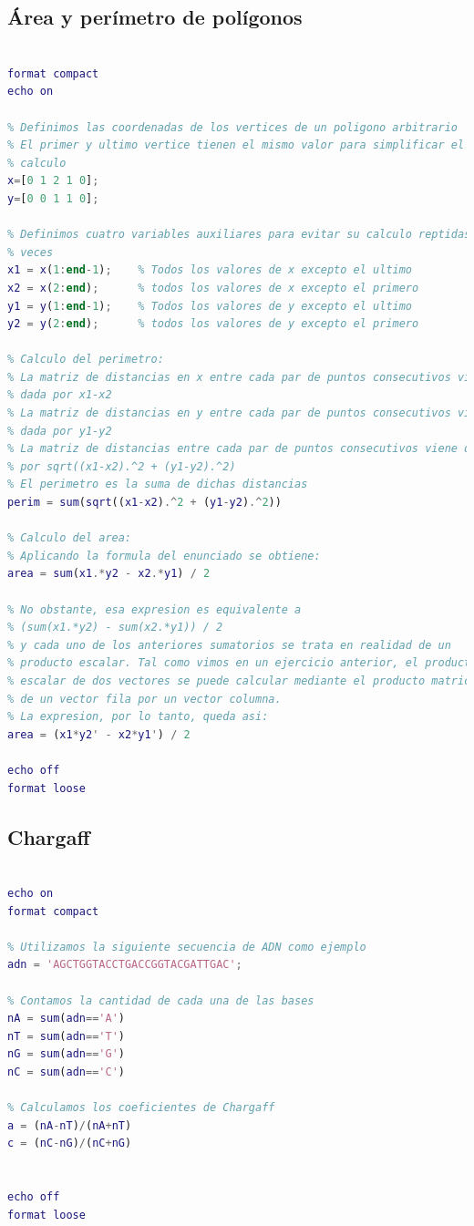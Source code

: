 \subsection{Área y perímetro de polígonos}
\begin{lstlisting}[language=Matlab]
% Ejercicio 14. area y Perimetro de poligonos

format compact
echo on

% Definimos las coordenadas de los vertices de un poligono arbitrario
% El primer y ultimo vertice tienen el mismo valor para simplificar el
% calculo
x=[0 1 2 1 0];
y=[0 0 1 1 0];

% Definimos cuatro variables auxiliares para evitar su calculo reptidas
% veces
x1 = x(1:end-1);    % Todos los valores de x excepto el ultimo
x2 = x(2:end);      % todos los valores de x excepto el primero
y1 = y(1:end-1);    % Todos los valores de y excepto el ultimo
y2 = y(2:end);      % todos los valores de y excepto el primero

% Calculo del perimetro:
% La matriz de distancias en x entre cada par de puntos consecutivos viene
% dada por x1-x2
% La matriz de distancias en y entre cada par de puntos consecutivos viene
% dada por y1-y2
% La matriz de distancias entre cada par de puntos consecutivos viene dada
% por sqrt((x1-x2).^2 + (y1-y2).^2)
% El perimetro es la suma de dichas distancias
perim = sum(sqrt((x1-x2).^2 + (y1-y2).^2))

% Calculo del area:
% Aplicando la formula del enunciado se obtiene:
area = sum(x1.*y2 - x2.*y1) / 2

% No obstante, esa expresion es equivalente a
% (sum(x1.*y2) - sum(x2.*y1)) / 2
% y cada uno de los anteriores sumatorios se trata en realidad de un
% producto escalar. Tal como vimos en un ejercicio anterior, el producto
% escalar de dos vectores se puede calcular mediante el producto matricial
% de un vector fila por un vector columna.
% La expresion, por lo tanto, queda asi:
area = (x1*y2' - x2*y1') / 2

echo off
format loose
\end{lstlisting}


\subsection{Chargaff}
\begin{lstlisting}[language=Matlab]
% Ejercicio 15. Chargaff

echo on
format compact

% Utilizamos la siguiente secuencia de ADN como ejemplo
adn = 'AGCTGGTACCTGACCGGTACGATTGAC';

% Contamos la cantidad de cada una de las bases
nA = sum(adn=='A')
nT = sum(adn=='T')
nG = sum(adn=='G')
nC = sum(adn=='C')

% Calculamos los coeficientes de Chargaff
a = (nA-nT)/(nA+nT)
c = (nC-nG)/(nC+nG)


echo off
format loose
\end{lstlisting}




